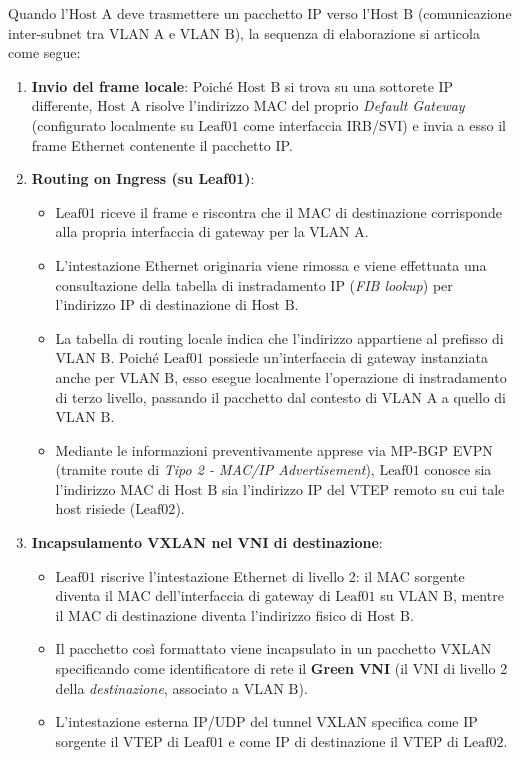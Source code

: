 \documentclass[11pt, a4paper]{article}
\begin{document}
Quando l'$\text{Host A}$ deve trasmettere un pacchetto IP verso l'$\text{Host B}$ (comunicazione inter-subnet tra $\text{VLAN A}$ e $\text{VLAN B}$), la sequenza di elaborazione si articola come segue:

\begin{enumerate}
    \item \textbf{Invio del frame locale}: Poiché $\text{Host B}$ si trova su una sottorete IP differente, $\text{Host A}$ risolve l'indirizzo MAC del proprio \emph{Default Gateway} (configurato localmente su $\text{Leaf01}$ come interfaccia IRB/SVI) e invia a esso il frame Ethernet contenente il pacchetto IP.

    \item \textbf{Routing on Ingress (su Leaf01)}:
    \begin{itemize}[noitemsep]
        \item $\text{Leaf01}$ riceve il frame e riscontra che il MAC di destinazione corrisponde alla propria interfaccia di gateway per la $\text{VLAN A}$.
        \item L'intestazione Ethernet originaria viene rimossa e viene effettuata una consultazione della tabella di instradamento IP (\emph{FIB lookup}) per l'indirizzo IP di destinazione di $\text{Host B}$.
        \item La tabella di routing locale indica che l'indirizzo appartiene al prefisso di $\text{VLAN B}$. Poiché $\text{Leaf01}$ possiede un'interfaccia di gateway instanziata anche per $\text{VLAN B}$, esso esegue localmente l'operazione di instradamento di terzo livello, passando il pacchetto dal contesto di $\text{VLAN A}$ a quello di $\text{VLAN B}$.
        \item Mediante le informazioni preventivamente apprese via MP-BGP EVPN (tramite route di \emph{Tipo 2 - MAC/IP Advertisement}), $\text{Leaf01}$ conosce sia l'indirizzo MAC di $\text{Host B}$ sia l'indirizzo IP del VTEP remoto su cui tale host risiede ($\text{Leaf02}$).
    \end{itemize}

    \item \textbf{Incapsulamento VXLAN nel VNI di destinazione}:
    \begin{itemize}[noitemsep]
        \item $\text{Leaf01}$ riscrive l'intestazione Ethernet di livello 2: il MAC sorgente diventa il MAC dell'interfaccia di gateway di $\text{Leaf01}$ su $\text{VLAN B}$, mentre il MAC di destinazione diventa l'indirizzo fisico di $\text{Host B}$.
        \item Il pacchetto così formattato viene incapsulato in un pacchetto VXLAN specificando come identificatore di rete il \textbf{Green VNI} (il VNI di livello 2 della \emph{destinazione}, associato a $\text{VLAN B}$).
        \item L'intestazione esterna IP/UDP del tunnel VXLAN specifica come IP sorgente il VTEP di $\text{Leaf01}$ e come IP di destinazione il VTEP di $\text{Leaf02}$.
    \end{itemize}


\end{enumerate}
\end{document}
